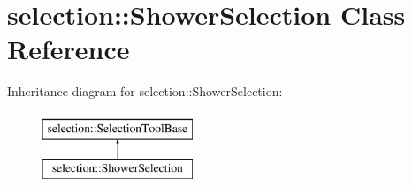 \hypertarget{classselection_1_1ShowerSelection}{\section{selection\-:\-:Shower\-Selection Class Reference}
\label{classselection_1_1ShowerSelection}
}
Inheritance diagram for selection\-:\-:Shower\-Selection\-:\begin{figure}[H]
\begin{center}
\leavevmode
\includegraphics[height=2.000000cm]{classselection_1_1ShowerSelection}
\end{center}
\end{figure}
